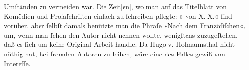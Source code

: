 {{                  Umſtänden zu vermeiden war. Die Zeit{[}en{]}, wo man auf das
                  Titelblatt von Komödien und Proſaſchriften einfach zu ſchreiben pflegte: » von X. X.« ſind vorüber, aber
                  ſelbſt damals benützte man die Phraſe »Nach dem Franzöſiſchen«, um, wenn man ſchon
                  den Autor nicht nennen wollte, wenigſtens zuzugeſtehen, daß es ſich um keine
                  Original-Arbeit handle. Da Hugo v.
                     Hofmannsthal nicht nöthig hat, bei fremden Autoren zu leihen, wäre eine
                      des Falles gewiß von Intereſſe.}}\pend
           \endnumbering{}  
      